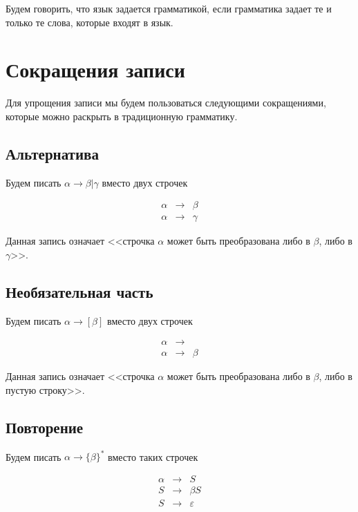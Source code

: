 \documentclass[12pt,a4paper,oneside]{article}
\begin{document}
\begin{definition}
Будем говорить, что язык задается грамматикой, если грамматика задает те и только
те слова, которые входят в язык.
\end{definition}

\section{Сокращения записи}

Для упрощения записи мы будем пользоваться следующими сокращениями, которые 
можно раскрыть в традиционную грамматику.

\subsection{Альтернатива}

Будем писать $\alpha \rightarrow \beta | \gamma$ вместо двух строчек
\begin{bnf}\begin{eqnarray*}
\alpha &\rightarrow&\beta\\
\alpha &\rightarrow&\gamma
\end{eqnarray*}\end{bnf}
\vspace{-0.3cm}

Данная запись означает <<строчка $\alpha$ может быть преобразована либо в $\beta$,
либо в $\gamma$>>.

\subsection{Необязательная часть}

Будем писать $\alpha \rightarrow [\beta]$ вместо двух строчек
\begin{bnf}\begin{eqnarray*}
\alpha &\rightarrow&\\
\alpha &\rightarrow&\beta
\end{eqnarray*}\end{bnf}
\vspace{-0.7cm}

Данная запись означает <<строчка $\alpha$ может быть преобразована либо в $\beta$,
либо в пустую строку>>.

\subsection{Повторение}

Будем писать $\alpha \rightarrow \{\beta\}^*$ вместо таких строчек
\begin{bnf}\begin{eqnarray*}
\alpha &\rightarrow&S\\
S &\rightarrow& \beta S \\
S &\rightarrow& \varepsilon
\end{eqnarray*}\end{bnf}
\vspace{-0.3cm}
\end{document}
